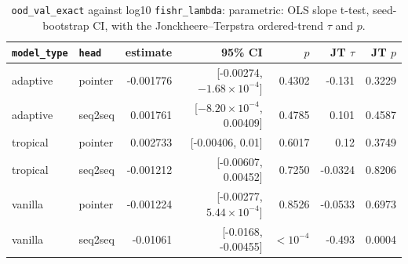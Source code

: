 \documentclass[10pt]{article}
\begin{document}
{\small
\begin{longtable}{llrrrrr}
\caption{\texttt{ood\_val\_exact} against log10 \texttt{fishr\_lambda}: parametric: OLS slope t-test, seed-bootstrap CI, with the Jonckheere--Terpstra ordered-trend $\tau$ and $p$.}\label{tab:trend-ood_val_exact}\\
\toprule
\texttt{model\_type} & \texttt{head} & estimate & 95\% CI & $p$ & JT $\tau$ & JT $p$\\
\midrule
\endhead
adaptive & pointer & -0.001776 & [-0.00274, $-1.68\times10^{-4}$] & 0.4302 & -0.131 & 0.3229\\
adaptive & seq2seq & 0.001761 & [$-8.20\times10^{-4}$, 0.00409] & 0.4785 & 0.101 & 0.4587\\
tropical & pointer & 0.002733 & [-0.00406, 0.01] & 0.6017 & 0.12 & 0.3749\\
tropical & seq2seq & -0.001212 & [-0.00607, 0.00452] & 0.7250 & -0.0324 & 0.8206\\
vanilla & pointer & -0.001224 & [-0.00277, $5.44\times10^{-4}$] & 0.8526 & -0.0533 & 0.6973\\
vanilla & seq2seq & -0.01061 & [-0.0168, -0.00455] & $<10^{-4}$ & -0.493 & 0.0004\\
\bottomrule
\end{longtable}
}
\end{document}
